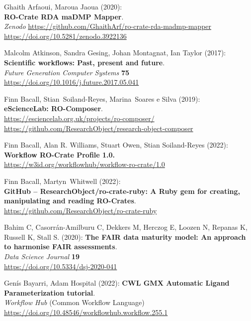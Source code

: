 \begin{thebibliography}{9}
Ghaith Arfaoui, Maroua Jaoua (2020):\\
\textbf{RO-Crate RDA maDMP Mapper}.\\
\emph{Zenodo}
\url{https://github.com/GhaithArf/ro-crate-rda-madmp-mapper}\\
\url{https://doi.org/10.5281/zenodo.3922136}

Malcolm Atkinson, Sandra Gesing, Johan Montagnat, Ian Taylor (2017):\\
\textbf{Scientific workflows: Past, present and future}.\\
\emph{Future Generation Computer Systems} \textbf{75}\\
\url{https://doi.org/10.1016/j.future.2017.05.041}


Finn Bacall, Stian~Soiland-Reyes, Marina~Soares e Silva
(2019):\\
\textbf{eScienceLab: RO-Composer}.\\
\url{https://esciencelab.org.uk/projects/ro-composer/}\\
\url{https://github.com/ResearchObject/research-object-composer}

Finn Bacall, Alan R. Williams, Stuart Owen, Stian
Soiland-Reyes (2022):\\
\textbf{Workflow RO-Crate Profile 1.0.}\\
\url{https://w3id.org/workflowhub/workflow-ro-crate/1.0}

Finn Bacall, Martyn~Whitwell (2022):\\
\textbf{GitHub -- ResearchObject/ro-crate-ruby: A Ruby gem for creating,
manipulating and reading RO-Crates}.\\
\url{https://github.com/ResearchObject/ro-crate-ruby}

Bahim C, Casorrán-Amilburu C, Dekkers M, Herczog E, Loozen N, Repanas K, Russell K, Stall S. (2020):
\textbf{The FAIR data maturity model: An approach to harmonise FAIR assessments}.\\
\emph{Data Science Journal} \textbf{19}\\
\url{https://doi.org/10.5334/dsj-2020-041}

Genís Bayarri, Adam Hospital (2022): \textbf{CWL GMX
Automatic Ligand Parameterization tutorial}.\\
\emph{Workflow Hub} (Common Workflow Language)\\
\url{https://doi.org/10.48546/workflowhub.workflow.255.1}


\end{thebibliography}
